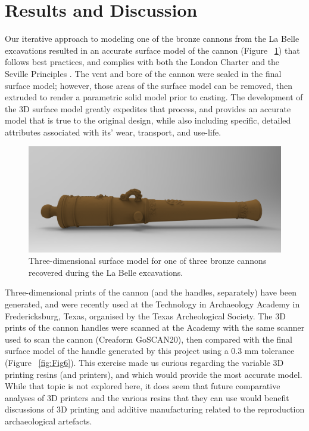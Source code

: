 \documentclass[review]{elsarticle}
\begin{document}
\section*{Results and Discussion}

Our iterative approach to modeling one of the bronze cannons from the La Belle excavations resulted in an accurate surface model of the cannon (Figure ~\ref{fig:Fig5}) that follows best practices, and complies with both the London Charter \citep{RN5872} and the Seville Principles \citep{RN5873}. The vent and bore of the cannon were sealed in the final surface model; however, those areas of the surface model can be removed, then extruded to render a parametric solid model prior to casting. The development of the 3D surface model greatly expedites that process, and provides an accurate model that is true to the original design, while also including specific, detailed attributes associated with its' wear, transport, and use-life.

\begin{figure}[ht]\centering
\includegraphics[width=\linewidth]{FigSurfaceModel}
\caption{Three-dimensional surface model for one of three bronze cannons recovered during the La Belle excavations.}
\label{fig:Fig5}
\end{figure}

Three-dimensional prints of the cannon (and the handles, separately) have been generated, and were recently used at the Technology in Archaeology Academy in Fredericksburg, Texas, organised by the Texas Archeological Society. The 3D prints of the cannon handles were scanned at the Academy with the same scanner used to scan the cannon (Creaform GoSCAN20), then compared with the final surface model of the handle generated by this project using a 0.3 mm tolerance (Figure ~\ref{fig:Fig6}). This exercise made us curious regarding the variable 3D printing resins (and printers), and which would provide the most accurate model. While that topic is not explored here, it does seem that future comparative analyses of 3D printers and the various resins that they can use would benefit discussions of 3D printing and additive manufacturing related to the reproduction archaeological artefacts.
\end{document}
